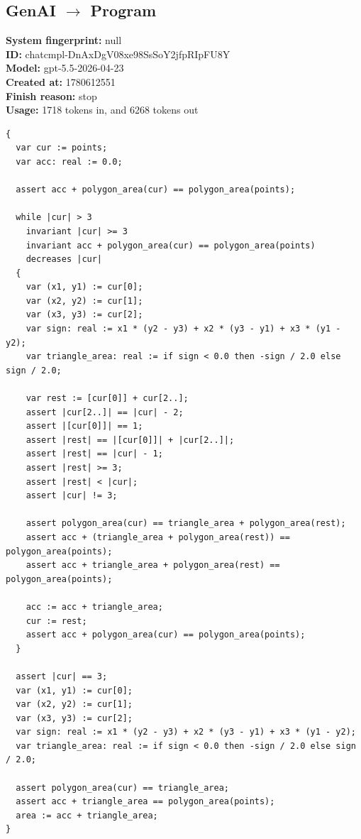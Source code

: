 \documentclass{article}
\begin{document}
\subsection*{GenAI $\rightarrow$ Program}
\textbf{System fingerprint: }null
\\\textbf{ID: }chatcmpl-DnAxDgV08xe98SsSoY2jfpRIpFU8Y
\\\textbf{Model: }gpt-5.5-2026-04-23
\\\textbf{Created at: }1780612551
\\\textbf{Finish reason: }stop
\\\textbf{Usage: }1718 tokens in, and 6268 tokens out
\begin{lstlisting}
{
  var cur := points;
  var acc: real := 0.0;

  assert acc + polygon_area(cur) == polygon_area(points);

  while |cur| > 3
    invariant |cur| >= 3
    invariant acc + polygon_area(cur) == polygon_area(points)
    decreases |cur|
  {
    var (x1, y1) := cur[0];
    var (x2, y2) := cur[1];
    var (x3, y3) := cur[2];
    var sign: real := x1 * (y2 - y3) + x2 * (y3 - y1) + x3 * (y1 - y2);
    var triangle_area: real := if sign < 0.0 then -sign / 2.0 else sign / 2.0;

    var rest := [cur[0]] + cur[2..];
    assert |cur[2..]| == |cur| - 2;
    assert |[cur[0]]| == 1;
    assert |rest| == |[cur[0]]| + |cur[2..]|;
    assert |rest| == |cur| - 1;
    assert |rest| >= 3;
    assert |rest| < |cur|;
    assert |cur| != 3;

    assert polygon_area(cur) == triangle_area + polygon_area(rest);
    assert acc + (triangle_area + polygon_area(rest)) == polygon_area(points);
    assert acc + triangle_area + polygon_area(rest) == polygon_area(points);

    acc := acc + triangle_area;
    cur := rest;
    assert acc + polygon_area(cur) == polygon_area(points);
  }

  assert |cur| == 3;
  var (x1, y1) := cur[0];
  var (x2, y2) := cur[1];
  var (x3, y3) := cur[2];
  var sign: real := x1 * (y2 - y3) + x2 * (y3 - y1) + x3 * (y1 - y2);
  var triangle_area: real := if sign < 0.0 then -sign / 2.0 else sign / 2.0;

  assert polygon_area(cur) == triangle_area;
  assert acc + triangle_area == polygon_area(points);
  area := acc + triangle_area;
}
\end{lstlisting}
\end{document}
